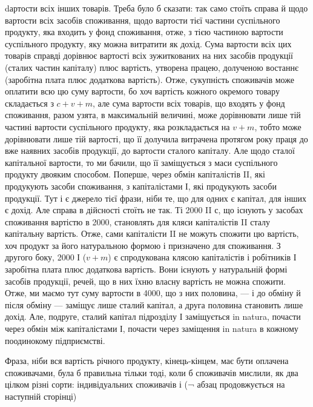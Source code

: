 dартости всіх інших товарів. Треба було б сказати: так само стоїть справа
й щодо вартости всіх засобів споживання, щодо вартости тієї
частини суспільного продукту, яка входить у фонд споживання, отже, з
тією частиною вартости суспільного продукту, яку можна витратити як
дохід. Сума вартости всіх цих товарів справді дорівнює вартості всіх
зужиткованих на них засобів продукції (сталих частин капіталу) плюс
вартість, утворена працею, долученою востаннє (заробітна плата плюс
додаткова вартість). Отже, сукупність споживачів може оплатити всю цю
суму вартости, бо хоч вартість кожного окремого товару складається
з $c + v + m$, але сума вартости всіх товарів, що входять у фонд
споживання, разом узята, в максимальній величині, може дорівнювати лише
тій частині вартости суспільного продукту, яка розкладається на $v + m$,
тобто може дорівнювати лише тій вартості, що її долучила витрачена
протягом року праця до вже наявних засобів продукції, до вартости сталого
капіталу. Але щодо сталої капітальної вартости, то ми бачили, що
її заміщується з маси суспільного продукту двояким способом. Поперше,
через обмін капіталістів II, які продукують засоби споживання, з капіталістами
І, які продукують засоби продукції. Тут і є джерело тієї фрази,
ніби те, що для одних є капітал, для інших є дохід. Але справа в дійсності
стоїть не так. Ті 2000 II с, що існують у засобах споживання вартістю
в 2000, становлять для кляси капіталістів II сталу капітальну вартість.
Отже, сами капіталісти II не можуть спожити цю вартість, хоч продукт
за його натуральною формою і призначено для споживання. З другого
боку, 2000 І ($v + m$) є спродукована клясою капіталістів і робітників І
заробітна плата плюс додаткова вартість. Вони існують у натуральній
формі засобів продукції, речей, що в них їхню власну вартість не можна
спожити. Отже, ми маємо тут суму вартости в 4000, що з них половина,
— і до обміну й після обміну — заміщує лише сталий капітал,
а друга половина становить лише дохід. Але, подруге, сталий капітал
підрозділу І заміщується in natura, почасти через обмін між капіталістами
І, почасти через заміщення in natura в кожному поодинокому підприємстві.

Фраза, ніби вся вартість річного продукту, кінець-кінцем, має бути
оплачена споживачами, була б правильна тільки тоді, коли б споживачів
мислили, як два цілком різні сорти: індивідуальних споживачів і\parbreak{} (¬ абзац продовжується на наступній сторінці)
